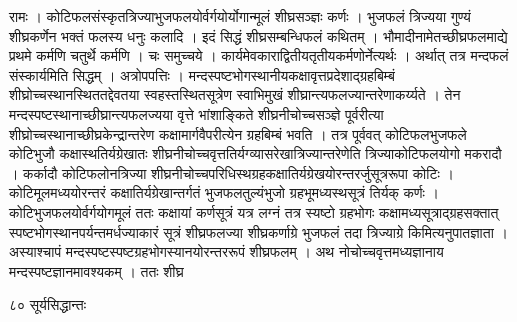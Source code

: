 \documentclass[11pt, openany]{book}
\begin{document}
\begin{sloppypar}
\noindent रामः । कोटिफलसंस्कृतत्रिज्याभुजफलयोर्वर्गयोर्योगान्मूलं शीघ्रसञ्ज्ञः कर्णः । भुजफलं त्रिज्यया गुण्यं शीघ्रकर्णेन भक्तं फलस्य धनुः कलादि । इदं सिद्धं शीघ्रसम्बन्धिफलं कथितम् । भौमादीनामेतच्छीघ्रफलमाद्ये प्रथमे कर्मणि चतुर्थे कर्मणि । चः समुच्चये । कार्यमेवकाराद्वितीयतृतीयकर्मणोर्नेत्यर्थः । अर्थात् तत्र मन्दफलं संस्कार्यमिति सिद्धम् । अत्रोपपत्तिः । मन्दस्पष्टभोगस्थानीयकक्षावृत्तप्रदेशाद्ग्रहबिम्बं शीघ्रोच्चस्थानस्थिततद्देवतया स्वहस्तस्थितसूत्रेण स्वाभिमुखं शीघ्रान्त्यफलज्यान्तरेणाकर्य्यते । तेन मन्दस्पष्टस्थानाच्छीघ्रान्त्यफलज्यया वृत्ते भांशाङ्किते शीघ्रनीचोच्चसञ्ज्ञे पूर्वरीत्या शीघ्रोच्चस्थानाच्छीघ्रकेन्द्रान्तरेण कक्षामार्गवैपरीत्येन ग्रहबिम्बं भवति । तत्र पूर्ववत् कोटिफलभुजफले कोटिभुजौ कक्षास्थतिर्यग्रेखातः शीघ्रनीचोच्चवृत्ततिर्यग्व्यासरेखात्रिज्यान्तरेणेति त्रिज्याकोटिफलयोगो मकरादौ । कर्कादौ कोटिफलोनत्रिज्या शीघ्रनीचोच्चपरिधिस्थग्रहकक्षातिर्यग्रेखयोरन्तरर्जुसूत्ररूपा कोटिः । कोटिमूलमध्ययोरन्तरं कक्षातिर्यग्रेखान्तर्गतं भुजफलतुल्यंभुजो ग्रहभूमध्यस्थसूत्रं तिर्यक् कर्णः । कोटिभुजफलयोर्वर्गयोगमूलं ततः कक्षायां कर्णसूत्रं यत्र लग्नं तत्र स्यष्टो ग्रहभोगः कक्षामध्यसूत्राद्ग्रहसक्तात् स्पष्टभोगस्थानपर्यन्तमर्धज्याकारं सूत्रं शीघ्रफलज्या शीघ्रकर्णाग्रे भुजफलं तदा त्रिज्याग्रे किमित्यनुपातज्ञाता । अस्याश्चापं मन्दस्पष्टस्पष्टग्रहभोगस्यानयोरन्तररूपं शीघ्रफलम् । अथ नोचोच्चवृत्तमध्यज्ञानाय मन्दस्पष्टज्ञानमावश्यकम् । ततः शीघ्र\textendash
\end{sloppypar}

\newpage

\noindent ८० \hspace{4cm} सूर्यसिद्धान्तः
\vspace{1cm}
\end{document}
